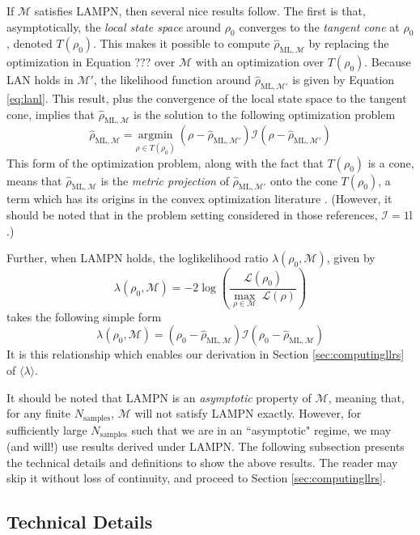 \documentclass[aps,pra, twocolumn]{revtex4-1}
\newcommand{\M}{\mathcal{M}}
\newcommand{\cL}{\mathcal{L}}
\newcommand{\Id}{\mathbb{I}}
\def\Id{1\!\mathrm{l}}
\newcommand{\rhohat}{\hat{\rho}}
\newcommand{\rhoML}[1]{\rhohat_{\scriptscriptstyle{\mathrm{ML},#1}}}
\begin{document}

If $\M$ satisfies LAMPN, then several nice results follow. The first is that, asymptotically, the \emph{local state space} around $\rho_{0}$ converges to the \emph{tangent cone} at $\rho_{0}$, denoted $T(\rho_{0})$. This makes it possible to compute $\rhoML{\M}$ by replacing the optimization in Equation ??? over $\M$ with an optimization over $T(\rho_{0})$. Because LAN holds in $\M'$, the likelihood function around $\rhoML{\M'}$ is given by Equation \eqref{eq:lanl}. This result, plus the convergence of the local state space to the tangent cone, implies that $\rhoML{\M}$ is the solution to the following optimization problem
\begin{equation}
\label{eq:lampnmle}
\rhoML{\M} = \underset{\rho \in T(\rho_{0})}{\text{argmin}}~(\rho  -\rhoML{\M'})\mathcal{I}(\rho  -\rhoML{\M'})
\end{equation}
This form of the optimization problem, along with the fact that $T(\rho_{0})$ is a cone, means that $\rhoML{\M}$ is the \emph{metric projection} of $\rhoML{\M'}$ onto the cone $T(\rho_{0})$, a term which has its origins in the convex optimization literature \cite{McCoy2014, Amelunxen2014}. (However, it should be noted that in the problem setting considered in those references, $\mathcal{I} = \Id$.)

Further, when LAMPN holds, the loglikelihood ratio $\lambda(\rho_{0}, \M)$, given by
\[\lambda(\rho_{0}, \M) = -2 \log \left(\frac{\cL(\rho_{0})}{\underset{\rho \in \M}{\max}~\cL(\rho)}\right)\]
takes the following simple form
\[\lambda(\rho_{0}, \M) =  (\rho_{0} - \rhoML{\M})\mathcal{I}(\rho_{0} - \rhoML{\M})\]
It is this relationship which enables our derivation in Section \ref{sec:computingllrs} of $\langle \lambda \rangle$.

It should be noted that LAMPN is an \emph{asymptotic} property of $\M$, meaning that, for any finite $N_{\mathrm{samples}}$, $\M$ will not satisfy LAMPN exactly. However, for sufficiently large $N_{\mathrm{samples}}$ such that we are in an ``asymptotic" regime, we may (and will!) use results derived under LAMPN. The following subsection presents the technical details and definitions to show the above results. The reader may skip it without loss of continuity, and proceed to Section \ref{sec:computingllrs}.

\subsection{Technical Details}
\end{document}
